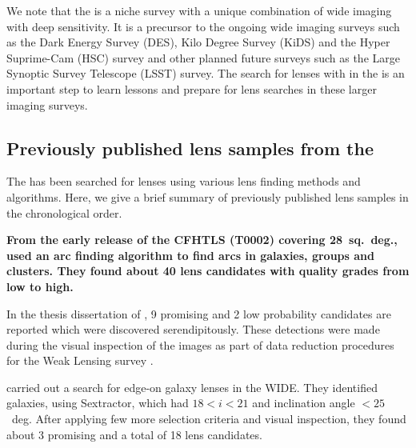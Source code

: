 \documentclass[useAMS,usenatbib,a4paper]{mn2e}
\begin{document}
We note that the \cfhtls is a niche survey with a unique combination of wide
imaging with deep sensitivity. It is a precursor to the ongoing wide imaging
surveys such as the Dark Energy Survey (DES), Kilo Degree Survey (KiDS) and the
Hyper Suprime-Cam (HSC) survey and other planned future surveys such as the
Large Synoptic Survey Telescope (LSST) survey.  The search for lenses with \sw
in the \cfhtls is an important step to learn lessons and prepare for lens
searches in these larger imaging surveys.



\subsection{Previously published lens samples from the \cfhtls}
\label{sec:data:kls}

The \cfhtls has been searched for lenses using various lens finding
methods and algorithms. Here, we give a brief summary of previously published lens
samples in the chronological order.

{\bf From the early release of the CFHTLS (T0002) covering 28~sq.~deg.,
\citet{Cabanac2007} used an arc finding algorithm \citep{Alard2006} to
find arcs in galaxies, groups and clusters. They found about 40 lens
candidates with quality grades from low to high.}

In the thesis dissertation of \citet{Thanjavur2009}, 9 promising and 2
low probability candidates are reported which were discovered
serendipitously. These detections were made during the visual
inspection of the \cfhtls images as part of data reduction procedures
for the Weak Lensing survey \citep{Benjamin2007}.

\citet{Sygnet2010} carried out a search for edge-on galaxy lenses in the
\cfhtls WIDE. They identified galaxies, using {\sc Sextractor}, which
had $18<i<21$ and inclination angle $<25$~deg. After applying few more
selection criteria and visual inspection, they found about 3 promising
and a total of 18 lens candidates.
\end{document}
